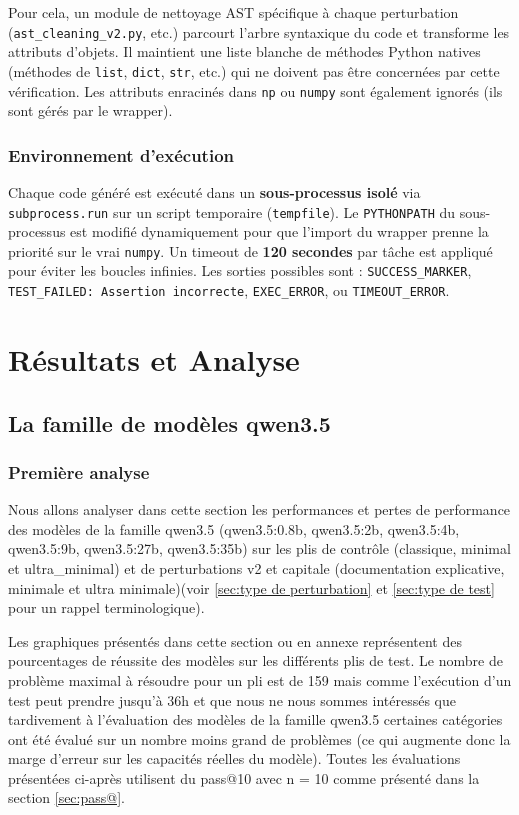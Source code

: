 \documentclass[11pt, a4paper]{article}
\begin{document}
Pour cela, un module de nettoyage AST spécifique à chaque perturbation (\texttt{ast\_cleaning\_v2.py}, etc.) parcourt l'arbre syntaxique du code et transforme les attributs d'objets. Il maintient une liste blanche de méthodes Python natives (méthodes de \texttt{list}, \texttt{dict}, \texttt{str}, etc.) qui ne doivent pas être concernées par cette vérification. Les attributs enracinés dans \texttt{np} ou \texttt{numpy} sont également ignorés (ils sont gérés par le wrapper).

\subsubsection{Environnement d'exécution}

Chaque code généré est exécuté dans un \textbf{sous-processus isolé} via \texttt{subprocess.run} sur un script temporaire (\texttt{tempfile}). Le \texttt{PYTHONPATH} du sous-processus est modifié dynamiquement pour que l'import du wrapper prenne la priorité sur le vrai \texttt{numpy}. Un timeout de \textbf{120 secondes} par tâche est appliqué pour éviter les boucles infinies. Les sorties possibles sont : \texttt{SUCCESS\_MARKER}, \texttt{TEST\_FAILED: Assertion incorrecte}, \texttt{EXEC\_ERROR}, ou \texttt{TIMEOUT\_ERROR}.

\section{Résultats et Analyse}
\subsection{La famille de modèles qwen3.5}
\subsubsection{Première analyse}
Nous allons analyser dans cette section les performances et pertes de performance des modèles de la famille qwen3.5 (qwen3.5:0.8b, qwen3.5:2b, qwen3.5:4b, qwen3.5:9b, qwen3.5:27b, qwen3.5:35b) sur les plis de contrôle (classique, minimal et ultra\_minimal) et de perturbations v2 et capitale (documentation explicative, minimale et ultra minimale)(voir \ref{sec:type de perturbation} et \ref{sec:type de test} pour un rappel terminologique).

Les graphiques présentés dans cette section ou en annexe représentent des pourcentages de réussite des modèles sur les différents plis de test. Le nombre de problème maximal à résoudre pour un pli est de 159 mais comme l'exécution d'un test peut prendre jusqu'à 36h et que nous ne nous sommes intéressés que tardivement à l'évaluation des modèles de la famille qwen3.5 certaines catégories ont été évalué sur un nombre moins grand de problèmes (ce qui augmente donc la marge d'erreur sur les capacités réelles du modèle). Toutes les évaluations présentées ci-après utilisent du pass@10 avec n = 10 comme présenté dans la section \ref{sec:pass@}.
\end{document}

